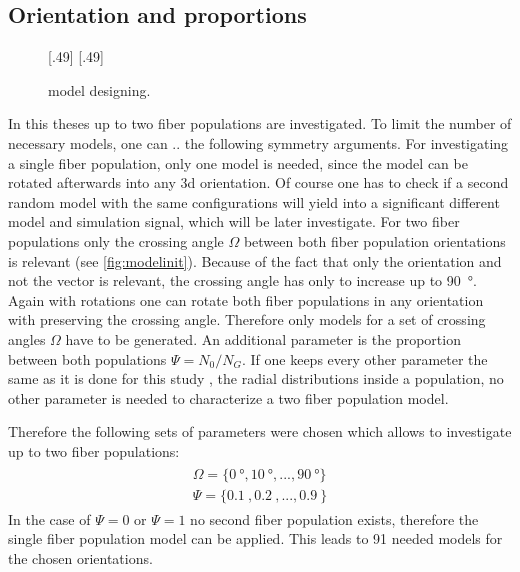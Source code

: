 \subsection{Orientation and proportions}
% 
\begin{figure}[t]
\centering
\def\tikzwidth{0.42*\textwidth}
[.49\textwidth]{\hfill{}\hfill}\hfill
{}
[.49\textwidth]{\hfill{}\hfill}
\\
\caption{model designing.}
\label{fig:twomodelpopdesign}
\end{figure}
% 
In this theses up to two fiber populations are investigated. 
To limit the number of necessary models, one can .. the following symmetry arguments.
% 
For investigating a single fiber population, only one model is needed, since the model can be rotated afterwards into any 3d orientation.
Of course one has to check if a second random model with the same configurations will yield into a significant different model and simulation signal, which will be later investigate.
For two fiber populations only the crossing angle $\Omega$ between both fiber population orientations is relevant (see \cref{fig:modelinit}).
Because of the fact that only the orientation and not the vector is relevant, the crossing angle has only to increase up to \SI{90}{\degree}.
Again with rotations one can rotate both fiber populations in any orientation with preserving the crossing angle.
Therefore only models for a set of crossing angles $\Omega$ have to be generated.
An additional parameter is the proportion between both populations $\Psi=N_0/N_G$.
If one keeps every other parameter the same as it is done for this study , \eg{} the radial distributions inside a population, no other parameter is needed to characterize a two fiber population model.
\par
% 
Therefore the following sets of parameters were chosen which allows to investigate up to two fiber populations:
\begin{align}
    \begin{split}
        \Omega = \{\SI{0}{\degree}, \SI{10}{\degree}, ..., \SI{90}{\degree}\}\\
        \Psi = \{\SI{0.1}{}, \SI{0.2}{}, ..., \SI{0.9}{}\}
    \end{split}
\end{align}
In the case of $\Psi = 0$ or $\Psi = 1$ no second fiber population exists, therefore the single fiber population model can be applied.
This leads to 91 needed models for the chosen orientations.
% 

